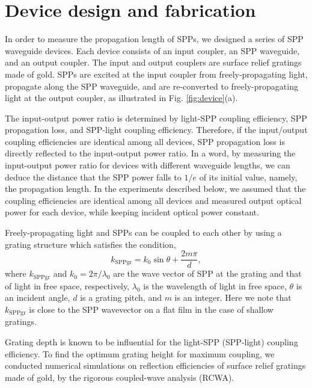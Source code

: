 \documentclass[aip,apl,reprint]{revtex4-1}
\begin{document}
\section{Device design and fabrication}
\label{sec:device}
In order to measure the propagation length of SPPs, we designed a series of SPP waveguide devices. Each device consists of an input coupler, an SPP waveguide, and an output coupler.  The input and output couplers are surface relief gratings made of gold. SPPs are  excited at the input coupler from freely-propagating light, propagate along the SPP waveguide, and are re-converted to freely-propagating light at the output coupler, as illustrated in Fig. \ref{fig:device}(a). 

The input-output power ratio is determined by light-SPP coupling efficiency, SPP propagation loss, and SPP-light coupling efficiency. Therefore, if the input/output coupling efficiencies are identical among all devices, SPP propagation loss is directly reflected to the input-output power ratio. In a word, by measuring the input-output power ratio for devices with different waveguide lengths, we can deduce the distance that the SPP power falls to $1/e$ of its initial value, namely, the propagation length. In the experiments described below, we assumed that the coupling efficiencies are identical among all devices and measured output optical power for each device, while keeping incident optical power constant. 

Freely-propagating light and SPPs can be coupled to each other by using a grating structure which satisfies the condition\cite{Koev},
\begin{equation}
k_{\mathrm{SPPgr}}=k_0 \sin \theta + \frac{2m\pi}{d},
\label{eq:phase-match}
\end{equation}
where $k_{\mathrm{SPPgr}}$ and $k_0=2\pi/\lambda_0$ are the wave vector of SPP at the grating and that of light in free space, respectively, $\lambda_0$ is the wavelength of light in free space, $\theta$ is an incident angle, $d$ is a grating pitch, and $m$ is an integer. Here we note that $k_{\mathrm{SPPgr}}$ is close to the SPP wavevector on a flat film in the case of shallow gratings.

Grating depth is known to be influential for the light-SPP (SPP-light) coupling efficiency\cite{Koev, Cleary2010}. To find the optimum grating height for maximum coupling, we conducted numerical simulations on reflection efficiencies of surface relief gratings made of gold, by the rigorous coupled-wave analysis (RCWA)\cite{Leveque}. 
\end{document}
